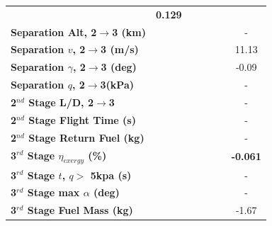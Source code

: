 \begin{table}[ht]
\begin{tabular}{l c c c c c c}
	& \textbf{0.129}
	\\
	\textbf{Separation Alt, 2$\rightarrow$3 (km)}
	& \secondthirdSeparationAltIspNinety
	& \secondthirdSeparationAltIspNinetyFive
	& \secondthirdSeparationAltIspStandard
	& \secondthirdSeparationAltIspOneHundredFive
	& \secondthirdSeparationAltIspOneHundredTen
	& -
	\\
	\textbf{Separation $v$, 2$\rightarrow$3 (m/s)}
	& \secondthirdSeparationvIspNinety
	& \secondthirdSeparationvIspNinetyFive
	& \secondthirdSeparationvIspStandard
	& \secondthirdSeparationvIspOneHundredFive
	& \secondthirdSeparationvIspOneHundredTen
	&11.13
	\\
	\textbf{Separation $\gamma$, 2$\rightarrow$3 (deg)}
	& \secondthirdSeparationgammaIspNinety
	& \secondthirdSeparationgammaIspNinetyFive
	& \secondthirdSeparationgammaIspStandard
	& \secondthirdSeparationgammaIspOneHundredFive
	& \secondthirdSeparationgammaIspOneHundredTen
	&-0.09
	\\
	\textbf{Separation $q$, 2$\rightarrow$3(kPa)}
	& \secondthirdSeparationqIspNinety
	& \secondthirdSeparationqIspNinetyFive
	& \secondthirdSeparationqIspStandard
	& \secondthirdSeparationqIspOneHundredFive
	& \secondthirdSeparationqIspOneHundredTen
	& -
	\\
	\textbf{2$^{nd}$ Stage L/D, 2$\rightarrow$3}
	& \secondthirdSeparationLDIspNinety
	& \secondthirdSeparationLDIspNinetyFive
	& \secondthirdSeparationLDIspStandard
	& \secondthirdSeparationLDIspOneHundredFive
	& \secondthirdSeparationLDIspOneHundredTen
	& -
	\\
	\textbf{2$^{nd}$ Stage Flight Time (s)}
	& \secondFlightTimeIspNinety
	& \secondFlightTimeIspNinetyFive
	& \secondFlightTimeIspStandard
	& \secondFlightTimeIspOneHundredFive
	& \secondFlightTimeIspOneHundredTen
	& -
	\\
		\textbf{2$^{nd}$ Stage Return Fuel (kg)}
		& \returnFuelIspNinety
		& \returnFuelIspNinetyFive
		& \returnFuelIspStandard
		& \returnFuelIspOneHundredFive
		& \returnFuelIspOneHundredTen
		& -
		\\
	\hline 
	\textbf{3$^{rd}$ Stage $\eta_{exergy}$ (\%)}
	& \textbf{\thirddExergyEffIspNinety}
	& \textbf{\thirddExergyEffIspNinetyFive}
	& \textbf{\thirddExergyEffIspStandard}
	& \textbf{\thirddExergyEffIspOneHundredFive}
	& \textbf{\thirddExergyEffIspOneHundredTen}
	& \textbf{-0.061}
	\\
	\textbf{3$^{rd}$ Stage $t$, $q >$ 5kpa (s)}
	& \thirdqOverFiveIspNinety
	& \thirdqOverFiveIspNinetyFive
	& \thirdqOverFiveIspStandard
	& \thirdqOverFiveIspOneHundredFive
	& \thirdqOverFiveIspOneHundredTen
	& -
	\\
	\textbf{3$^{rd}$ Stage max $\alpha$ (deg)}
	& \thirdmaxAoAIspNinety
	& \thirdmaxAoAIspNinetyFive
	& \thirdmaxAoAIspStandard
	& \thirdmaxAoAIspOneHundredFive
	& \thirdmaxAoAIspOneHundredTen
	& -
	\\
	\textbf{3$^{rd}$ Stage Fuel Mass (kg)}
	& \thirdmFuelIspNinety
	& \thirdmFuelIspNinetyFive
	& \thirdmFuelIspStandard
	& \thirdmFuelIspOneHundredFive
	& \thirdmFuelIspOneHundredTen
	&-1.67
	\\
	\hline 
\end{tabular} 

\end{table}

